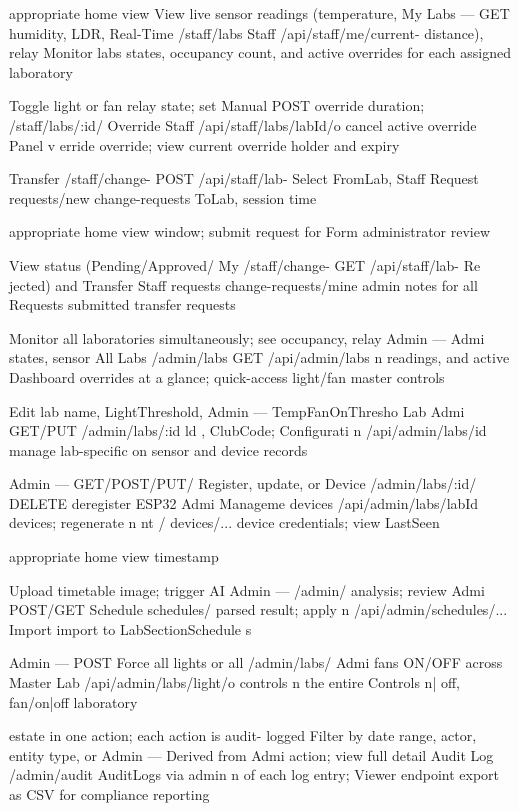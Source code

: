 appropriate home
view
View live sensor
readings
(temperature,
My Labs --- GET humidity, LDR,
Real-Time /staff/labs Staff /api/staff/me/current- distance), relay
Monitor labs states, occupancy
count, and active
overrides for each
assigned laboratory

Toggle light or fan
relay state; set
Manual POST override duration;
/staff/labs/:id/
Override Staff /api/staff/labs/{labId}/o cancel active
override
Panel v erride override; view
current override
holder and expiry


Transfer /staff/change- POST /api/staff/lab- Select FromLab,
Staff
Request requests/new change-requests ToLab, session time


appropriate home
view
window; submit
request for
Form
administrator
review

View status
(Pending/Approved/
My
/staff/change- GET /api/staff/lab- Re jected) and
Transfer Staff
requests change-requests/mine admin notes for all
Requests
submitted transfer
requests

Monitor all
laboratories
simultaneously; see
occupancy, relay
Admin ---
Admi states, sensor
All Labs /admin/labs GET /api/admin/labs
n readings, and active
Dashboard
overrides at a
glance; quick-access
light/fan master
controls

Edit lab name,
LightThreshold,
Admin --- TempFanOnThresho
Lab Admi GET/PUT
/admin/labs/:id ld , ClubCode;
Configurati n /api/admin/labs/{id}
manage lab-specific
on sensor and device
records


Admin --- GET/POST/PUT/ Register, update, or
Device /admin/labs/:id/ DELETE deregister ESP32
Admi
Manageme devices /api/admin/labs/{labId} devices; regenerate
n
nt / devices/... device credentials;
view LastSeen

appropriate home
view
timestamp

Upload timetable
image; trigger AI
Admin --- /admin/ analysis; review
Admi POST/GET
Schedule schedules/ parsed result; apply
n /api/admin/schedules/...
Import import to
LabSectionSchedule
s


Admin --- POST Force all lights or all
/admin/labs/ Admi fans ON/OFF across
Master Lab /api/admin/labs/light/o
controls n the entire
Controls n| off, fan/on|off
laboratory



estate in one action;
each action is audit-
logged
Filter by date range,
actor, entity type, or
Admin --- Derived from
Admi action; view full detail
Audit Log /admin/audit AuditLogs via admin
n of each log entry;
Viewer endpoint
export as CSV for
compliance reporting

